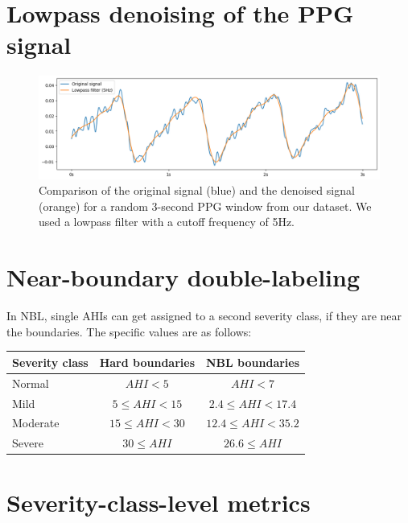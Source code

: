 \section{Lowpass denoising of the PPG signal \label{Apx-Denoise}}

\begin{figure}[h!]
    \centering
    \includegraphics[width=\textwidth]{images/Lowpass}
    \caption{Comparison of the original signal (blue) and the denoised signal (orange) for a random 3-second PPG window from our dataset. We used a lowpass filter with a cutoff frequency of 5Hz.}
    \label{fig:lowpass-example}
\end{figure}

\section{Near-boundary double-labeling \label{Apx-NBL}}

In NBL, single AHIs can get assigned to a second severity class, if they are near the boundaries. The specific values are as follows:

\renewcommand{\arraystretch}{1.5}
\begin{table}[h!]
    \centering
    \begin{tabular}{ l c c }
        Severity class & Hard boundaries & NBL boundaries \\
        \hline
        Normal   & $ AHI < 5 $         & $ AHI < 7 $             \\
        Mild     & $ 5 \le AHI < 15 $  & $ 2.4 \le AHI < 17.4 $  \\
        Moderate & $ 15 \le AHI < 30 $ & $ 12.4 \le AHI < 35.2 $ \\
        Severe   & $ 30 \le AHI $      & $ 26.6 \le AHI $        \\
    \end{tabular}
\end{table}

\section{Severity-class-level metrics \label{Apx-Severity-Metrics}}

